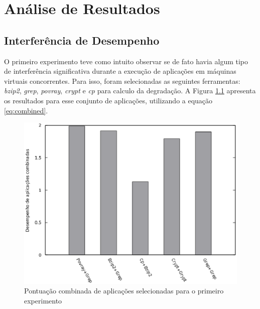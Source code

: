 \chapter{Análise de Resultados}
\label{cap:resultados}

\section{Interferência de Desempenho}
O primeiro experimento teve como intuito observar se de fato havia algum tipo de interferência significativa durante a execução de aplicações em máquinas virtuais concorrentes. Para isso, foram selecionadas as seguintes ferramentas: \textit{bzip2}, \textit{grep}, \textit{povray}, \textit{crypt} e \textit{cp} para calculo da degradação. A Figura \ref{first_experiment} apresenta os resultados para esse conjunto de aplicações, utilizando a equação \ref{eq:combined}. 

\begin{figure}[!htb]
\centering
\includegraphics [keepaspectratio=true,scale=0.65]{graficos/exp1.eps}
\caption{Pontuação combinada de aplicações selecionadas para o primeiro experimento}
\label{first_experiment}
\end{figure} 

